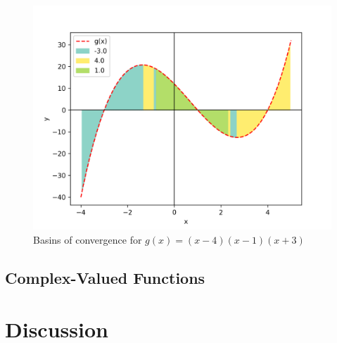 \documentclass[10pt,a4paper]{article}
\begin{document}
		\begin{figure}[h]
			\caption{Basins of convergence for $g(x) = (x - 4)(x - 1)(x + 3)$}
			\includegraphics[scale=0.75]{figure2}
		\end{figure}
		
		
		\subsection{Complex-Valued Functions}
		
	\section{Discussion}
\end{document}
